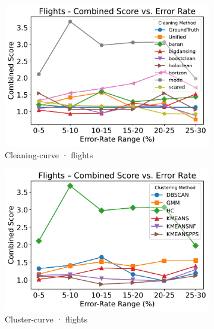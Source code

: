 \documentclass[10pt]{article} %
\numberwithin{equation}{section}
\begin{document}
\begin{figure}[htbp]
  \vspace{0.6em}
  \begin{subfigure}{0.35\linewidth}
    \centering
    \includegraphics[width=\linewidth]{figures/5.3.2graph/flights_combined_score_cleaning.pdf}
    \caption{Cleaning-curve · flights}
  \end{subfigure}\hfill
  \begin{subfigure}{0.35\linewidth}
    \centering
    \includegraphics[width=\linewidth]{figures/5.3.2graph/flights_combined_score_cluster.pdf}
    \caption{Cluster-curve · flights}
  \end{subfigure}\hfill
  \begin{subfigure}{0.295\linewidth}
    \centering

\end{subfigure}
\end{figure}
\end{document}
